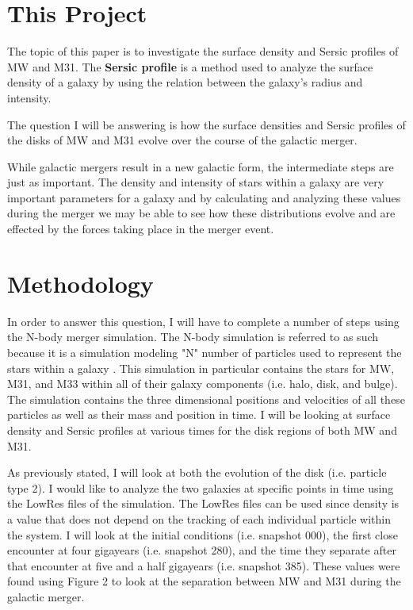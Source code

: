 \documentclass[linenumbers,trackchanges]{aastex7}
\begin{document}
\section{This Project} \label{sec:style}

The topic of this paper is to investigate the surface density and
Sersic profiles of MW and M31. The \textbf{Sersic profile} is a
method used to analyze the surface density of a galaxy by using the
relation between the galaxy's radius and intensity.

The question I will be answering is how the surface densities and
Sersic profiles of the disks of MW and M31 evolve over the
course of the galactic merger.

While galactic mergers result in a new galactic form, the intermediate
steps are just as important. The density and intensity of stars within
a galaxy are very important parameters for a galaxy and by calculating
and analyzing these values during the merger we may be able to see how
these distributions evolve and are effected by the forces taking place
in the merger event.

\section{Methodology} \label{sec:style}

In order to answer this question, I will have to complete a number of
steps using the N-body merger simulation. The N-body simulation is
referred to as such because it is a simulation modeling "N" number of
particles used to represent the stars within a galaxy
\citep{van_der_Marel_Besla_Cox_Sohn_Anderson_2012}. This simulation in
particular contains the stars for MW, M31, and M33 within all of their
galaxy components (i.e. halo, disk, and bulge). The simulation
contains the three dimensional positions and velocities of all these
particles as well as their mass and position in time. I will be
looking at surface density and Sersic profiles at various times for
the disk regions of both MW and M31.

As previously stated, I will look at both the evolution of the disk
(i.e. particle type 2). I would
like to analyze the two galaxies at specific points in time using the
LowRes files of the simulation. The LowRes files can be used since
density is a value that does not depend on the tracking of each
individual particle within the system. I will look at the initial
conditions (i.e. snapshot 000), the first close encounter at four
gigayears (i.e. snapshot 280), and the time they separate after that
encounter at five and a half gigayears (i.e. snapshot 385). These
values were found using Figure 2 to look at the separation between MW
and M31 during the galactic merger.
\end{document}
